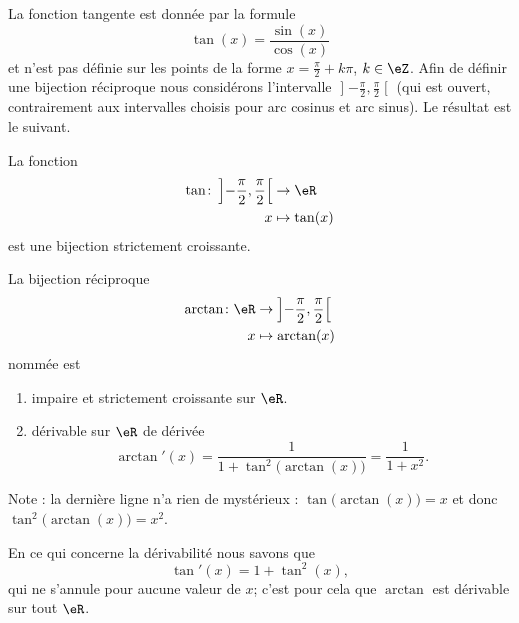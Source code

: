 La fonction tangente est donnée par la formule
\begin{equation}
    \tan(x)=\frac{ \sin(x) }{ \cos(x) }
\end{equation}
et n'est pas définie sur les points de la forme \( x=\frac{ \pi }{2}+k\pi\), \( k\in \eZ\). Afin de définir une bijection réciproque nous considérons l'intervalle \( \mathopen] -\frac{ \pi }{2} , \frac{ \pi }{2} \mathclose[\) (qui est ouvert, contrairement aux intervalles choisis pour arc cosinus et arc sinus). Le résultat est le suivant.

\begin{theorem}     \label{THOooUSVGooOAnCvC}
    La fonction
    \begin{equation}
        \begin{aligned}
        \tan\colon \left] -\frac{ \pi }{2} , \frac{ \pi }{2} \right[&\to \eR \\
            x&\mapsto \tan(x) 
        \end{aligned}
    \end{equation}
    est une bijection strictement croissante.

    La bijection réciproque 
    \begin{equation}
        \begin{aligned}
        \arctan\colon \eR&\to \left] -\frac{ \pi }{2} , \frac{ \pi }{2} \right[ \\
            x&\mapsto \arctan(x) 
        \end{aligned}
    \end{equation}
    nommée  est
    \begin{enumerate}
        \item
            impaire et strictement croissante sur \( \eR\).
        \item       \label{ITEMooMNHLooOVhIIb}
            dérivable sur \( \eR\) de dérivée
            \begin{equation}
                \arctan'(x)=\frac{1}{ 1+\tan^2\big( \arctan(x) \big) }=\frac{1}{ 1+x^2 }.
            \end{equation}
    \end{enumerate}
\end{theorem}
Note : la dernière ligne n'a rien de mystérieux : \( \tan\big( \arctan(x) \big)=x\) et donc \( \tan^2\big( \arctan(x) \big)=x^2\).    

En ce qui concerne la dérivabilité nous savons que
\begin{equation}
    \tan'(x)=1+\tan^2(x) ,
\end{equation}
qui ne s'annule pour aucune valeur de \( x\); c'est pour cela que \( \arctan\) est dérivable sur tout \( \eR\).

